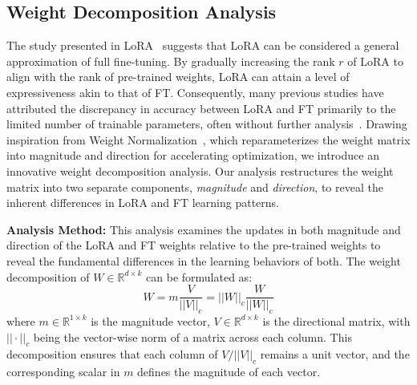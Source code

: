 \documentclass{article}
\theoremstyle{plain}
\theoremstyle{definition}
\theoremstyle{remark}
\begin{document}
\subsection{Weight Decomposition Analysis}

The study presented in LoRA~\cite{hu2022lora} suggests that LoRA can be considered a general approximation of full fine-tuning. By gradually increasing the rank $r$ of LoRA to align with the rank of pre-trained weights, LoRA can attain a level of expressiveness akin to that of FT. Consequently, many previous studies have attributed the discrepancy in accuracy between LoRA and FT primarily to the limited number of trainable parameters, often without further analysis~\cite{hu2022lora, kopiczko2023vera}. Drawing inspiration from Weight Normalization~\cite{salimans2016weight}, which reparameterizes the weight matrix into magnitude and direction for accelerating optimization, we introduce an innovative weight decomposition analysis. Our analysis restructures the weight matrix into two separate components, \textit{magnitude} and \textit{direction}, to reveal the inherent differences in LoRA and FT learning patterns.

\textbf{Analysis Method: }This analysis examines the updates in both magnitude and direction of the LoRA and FT weights relative to the pre-trained weights to reveal the fundamental differences in the learning behaviors of both. The weight decomposition of $W \in \mathbb{R}^{d \times k}$ can be formulated as:
\begin{equation}
W = m\frac{V}{||V||_{c}} = ||W||_{c}\frac{W}{||W||_{c}}
\label{eq:weight_decomposition}
\end{equation}
where $m \in \mathbb{R}^{1 \times k}$ is the magnitude vector, $V \in \mathbb{R}^{d \times k}$ is the directional matrix, with $||\cdot||_{c}$ being the vector-wise norm of a matrix across each column. This decomposition ensures that each column of $V/||V||_{c}$ remains a unit vector, and the corresponding scalar in $m$ defines the magnitude of each vector.

\end{document}
